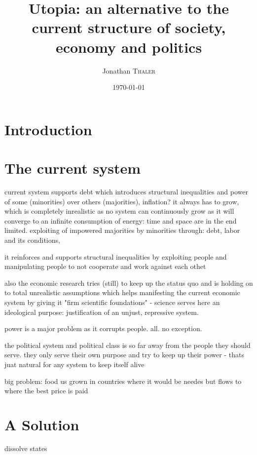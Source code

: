 \documentclass{article}
\title{Utopia: an alternative to the current structure of society, economy and politics} %
\author{Jonathan \textsc{Thaler}} %
\date{\today} %
\begin{document}
\maketitle %

\begin{abstract}

\end{abstract}

\section{Introduction}


\section{The current system}

current system supports debt which introduces structural inequalities and power of some (minorities) over others (majorities), inflation? it always has to grow, which is completely inrealistic as no system can continuously grow as it will converge to an infinite consumption of energy: time and space are in the end limited. exploiting of impowered majorities by minorities through: debt, labor and its conditions, 

it reinforces and supports structural inequalities by exploiting people and manipulating people to not cooperate and work against each othet

also the economic research tries (still) to keep up the status quo and is holding on to total unrealistic assumptions which helps manifesting the current economic system by giving it "firm scientific foundations" - science serves here an ideological purpose: justification of an unjust, repressive system.

power is a major problem as it corrupts people. all. no exception.

the political system and political class is so far away from the people they should serve. they only serve their own purpose and try to keep up their power - thats juat natural for any system to keep itself alive

big problem: food us grown in countries where it would be needes but flows to where the best price is paid

\section{A Solution}
dissolve states
\end{document}
